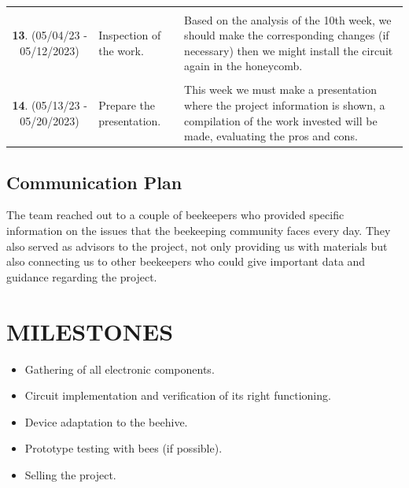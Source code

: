 \documentclass[12pt]{report}
\begin{document}
	\begin{table}[h!]
		\centering
		\caption[Homework and Project Chronology]{}
		\begin{tabular}{||c|m{4cm}|m{7cm}||}
			\hline
			&&\\ [-1.8ex]
			\textbf{13}. (05/04/23 - 05/12/2023) & Inspection of the work. & Based on the analysis of the 10th week, we should make the corresponding changes (if necessary) then we might install the circuit again in the honeycomb. \\ [0.5ex] \hline &&\\ [-1.8ex]
			\textbf{14}. (05/13/23 - 05/20/2023) & Prepare the presentation. & This week we must make a presentation where the project information is shown, a compilation of the work invested will be made, evaluating the pros and cons. \\ [0.5ex] \hline
		\end{tabular}
	\end{table}
	
	\section{Communication Plan}
	The team reached out to a couple of beekeepers who provided specific information on the issues that the beekeeping community faces every day. They also served as advisors to the project, not only providing us with materials but also connecting us to other beekeepers who could give important data and guidance regarding the project.
	
	
	\chapter{MILESTONES} %
	\begin{itemize}
		\item Gathering of all electronic components.
		\item Circuit implementation and verification of its right functioning.
		\item Device adaptation to the beehive.
		\item Prototype testing with bees (if possible).
		\item Selling the project.
	\end{itemize}
	
\end{document}
